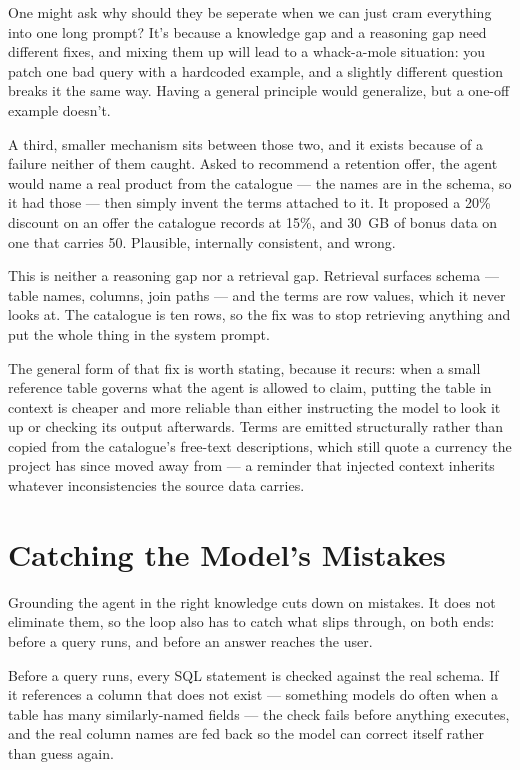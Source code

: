 One might ask why should they be seperate when we can just cram 
everything into one long prompt? It's because a knowledge gap and a 
reasoning gap need different fixes, and mixing them up will lead 
to a whack-a-mole situation: you patch one bad query with a 
hardcoded example, and a slightly different question breaks it 
the same way. Having a general principle would generalize, but a one-off
example doesn't. 


A third, smaller mechanism sits between those two, and it exists because of a
failure neither of them caught. Asked to recommend a retention offer, the agent
would name a real product from the catalogue --- the names are in the schema, so
it had those --- then simply invent the terms attached to it. It proposed a
20\% discount on an offer the catalogue records at 15\%, and 30~GB of bonus data
on one that carries 50. Plausible, internally consistent, and wrong.

This is neither a reasoning gap nor a retrieval gap. Retrieval surfaces schema
--- table names, columns, join paths --- and the terms are row values, which it
never looks at. The catalogue is ten rows, so the fix was to stop retrieving
anything and put the whole thing in the system prompt.




The general form of that fix is worth stating, because it recurs: when a small
reference table governs what the agent is allowed to claim, putting the table in
context is cheaper and more reliable than either instructing the model to look
it up or checking its output afterwards. Terms are emitted structurally rather
than copied from the catalogue's free-text descriptions, which still quote a
currency the project has since moved away from --- a reminder that injected
context inherits whatever inconsistencies the source data carries.

\section{Catching the Model's Mistakes}

Grounding the agent in the right knowledge cuts down on mistakes. It
does not eliminate them, so the loop also has to catch what slips
through, on both ends: before a query runs, and before an answer
reaches the user.

Before a query runs, every SQL statement is checked against the real schema. If
it references a column that does not exist --- something models do often when a
table has many similarly-named fields --- the check fails before anything
executes, and the real column names are fed back so the model can correct itself
rather than guess again.

